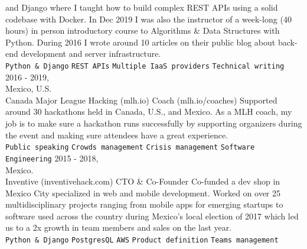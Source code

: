\documentclass[9pt]{developercv}
\begin{document}
\begin{entrylist}
{            and Django where I taught how to build complex REST APIs using a solid codebase with Docker.
            In Dec 2019 I was also the instructor of a week-long (40 hours) in person introductory
            course to Algorithms \& Data Structures with Python. During 2016 I wrote around 10
            articles on their public blog about back-end development and server infrastructure. \\
                \texttt{Python \& Django}\slashsep
                \texttt{REST APIs}\slashsep
                \texttt{Multiple IaaS providers}\slashsep
                \texttt{Technical writing}
        }
    \entry
        {2016 - 2019, \\Mexico, U.S.\\Canada}
        {Major League Hacking (mlh.io)}
        {Coach (mlh.io/coaches)}
        {
            Supported around 30 hackathons held in Canada, U.S., and Mexico. As
            a MLH coach, my job is to make sure a hackathon runs successfully by supporting
            organizers during the event and making sure attendees have a great experience.\\
                \texttt{Public speaking}\slashsep
                \texttt{Crowds management}\slashsep
                \texttt{Crisis management}\slashsep
                \texttt{Software Engineering}
        }
    \entry
        {
            2015 - 2018,\\
            Mexico.\\
        }
        {Inventive (inventivehack.com)}
        {CTO \& Co-Founder}
        {
            Co-funded a dev shop in Mexico City specialized in web and mobile development.
            Worked on over 25 multidisciplinary projects ranging from mobile apps for
            emerging startups to software used across the country during Mexico's local election
            of 2017 which led us to a 2x growth in team members and sales on the last year.\\
                \texttt{Python \& Django}\slashsep
                \texttt{PostgresQL}\slashsep
                \texttt{AWS}\slashsep
                \texttt{Product definition}\slashsep
                \texttt{Teams management}
        }
\end{entrylist}

\end{document}
